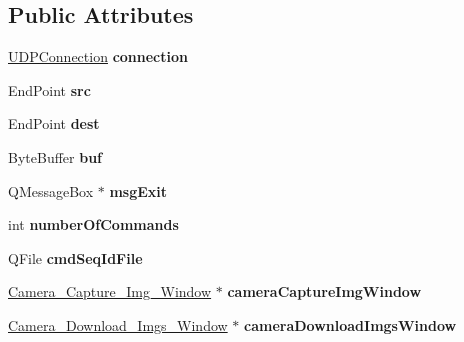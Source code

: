\subsection*{Public Attributes}
\begin{DoxyCompactItemize}
\item 
\hyperlink{class_u_d_p_connection}{U\+D\+P\+Connection} {\bfseries connection}\hypertarget{class_b_c___f_s_w_command_a547d93f42f8950ecd93f52a12ac85155}{}\label{class_b_c___f_s_w_command_a547d93f42f8950ecd93f52a12ac85155}

\item 
End\+Point {\bfseries src}\hypertarget{class_b_c___f_s_w_command_a6ee66e652e72da22e71b1ef9b08740e3}{}\label{class_b_c___f_s_w_command_a6ee66e652e72da22e71b1ef9b08740e3}

\item 
End\+Point {\bfseries dest}\hypertarget{class_b_c___f_s_w_command_ac88bd114f14bbc078f5381f555675e8d}{}\label{class_b_c___f_s_w_command_ac88bd114f14bbc078f5381f555675e8d}

\item 
Byte\+Buffer {\bfseries buf}\hypertarget{class_b_c___f_s_w_command_a23dcb64b80b18693b5e06af12a852342}{}\label{class_b_c___f_s_w_command_a23dcb64b80b18693b5e06af12a852342}

\item 
Q\+Message\+Box $\ast$ {\bfseries msg\+Exit}\hypertarget{class_b_c___f_s_w_command_a74f5a0cbb7dd8c6b66112c5788b3bcac}{}\label{class_b_c___f_s_w_command_a74f5a0cbb7dd8c6b66112c5788b3bcac}

\item 
int {\bfseries number\+Of\+Commands}\hypertarget{class_b_c___f_s_w_command_a474add68e8053415c0bf84a3472c8775}{}\label{class_b_c___f_s_w_command_a474add68e8053415c0bf84a3472c8775}

\item 
Q\+File {\bfseries cmd\+Seq\+Id\+File}\hypertarget{class_b_c___f_s_w_command_ad0ee749d7f6a947d3c0d3fc870854484}{}\label{class_b_c___f_s_w_command_ad0ee749d7f6a947d3c0d3fc870854484}

\item 
\hyperlink{class_camera___capture___img___window}{Camera\+\_\+\+Capture\+\_\+\+Img\+\_\+\+Window} $\ast$ {\bfseries camera\+Capture\+Img\+Window}\hypertarget{class_b_c___f_s_w_command_ae179a0832323d2730d2f9caeb3492f64}{}\label{class_b_c___f_s_w_command_ae179a0832323d2730d2f9caeb3492f64}

\item 
\hyperlink{class_camera___download___imgs___window}{Camera\+\_\+\+Download\+\_\+\+Imgs\+\_\+\+Window} $\ast$ {\bfseries camera\+Download\+Imgs\+Window}\hypertarget{class_b_c___f_s_w_command_adb251f1c2609a8cf78d5b41dfff1023f}{}\label{class_b_c___f_s_w_command_adb251f1c2609a8cf78d5b41dfff1023f}


\end{DoxyCompactItemize}

